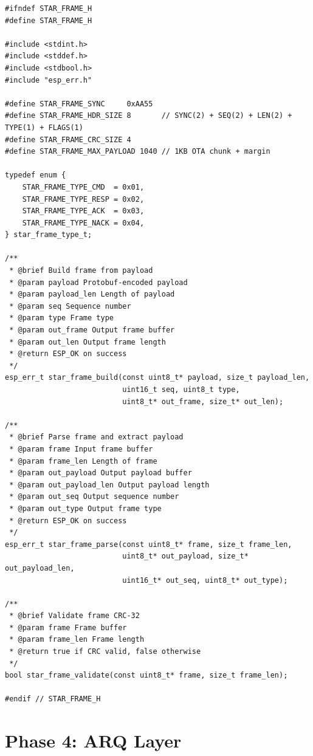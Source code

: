 \documentclass[12pt,letterpaper]{article}
\begin{document}
\begin{lstlisting}[caption={star\_frame.h - Frame Layer Interface}]
#ifndef STAR_FRAME_H
#define STAR_FRAME_H

#include <stdint.h>
#include <stddef.h>
#include <stdbool.h>
#include "esp_err.h"

#define STAR_FRAME_SYNC     0xAA55
#define STAR_FRAME_HDR_SIZE 8       // SYNC(2) + SEQ(2) + LEN(2) + TYPE(1) + FLAGS(1)
#define STAR_FRAME_CRC_SIZE 4
#define STAR_FRAME_MAX_PAYLOAD 1040 // 1KB OTA chunk + margin

typedef enum {
    STAR_FRAME_TYPE_CMD  = 0x01,
    STAR_FRAME_TYPE_RESP = 0x02,
    STAR_FRAME_TYPE_ACK  = 0x03,
    STAR_FRAME_TYPE_NACK = 0x04,
} star_frame_type_t;

/**
 * @brief Build frame from payload
 * @param payload Protobuf-encoded payload
 * @param payload_len Length of payload
 * @param seq Sequence number
 * @param type Frame type
 * @param out_frame Output frame buffer
 * @param out_len Output frame length
 * @return ESP_OK on success
 */
esp_err_t star_frame_build(const uint8_t* payload, size_t payload_len,
                           uint16_t seq, uint8_t type,
                           uint8_t* out_frame, size_t* out_len);

/**
 * @brief Parse frame and extract payload
 * @param frame Input frame buffer
 * @param frame_len Length of frame
 * @param out_payload Output payload buffer
 * @param out_payload_len Output payload length
 * @param out_seq Output sequence number
 * @param out_type Output frame type
 * @return ESP_OK on success
 */
esp_err_t star_frame_parse(const uint8_t* frame, size_t frame_len,
                           uint8_t* out_payload, size_t* out_payload_len,
                           uint16_t* out_seq, uint8_t* out_type);

/**
 * @brief Validate frame CRC-32
 * @param frame Frame buffer
 * @param frame_len Frame length
 * @return true if CRC valid, false otherwise
 */
bool star_frame_validate(const uint8_t* frame, size_t frame_len);

#endif // STAR_FRAME_H
\end{lstlisting}

\section{Phase 4: ARQ Layer}
\end{document}
